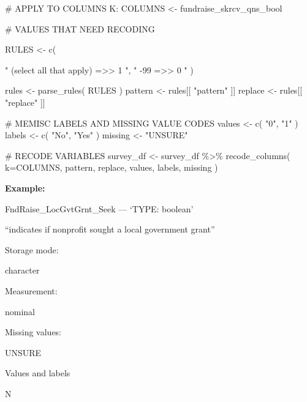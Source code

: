 \documentclass[
  letterpaper,
]{scrbook}
\newenvironment{Shaded}{\begin{snugshade}}{\end{snugshade}}
\newcommand{\AttributeTok}[1]{\textcolor[rgb]{0.40,0.45,0.13}{#1}}
\newcommand{\CommentTok}[1]{\textcolor[rgb]{0.37,0.37,0.37}{#1}}
\newcommand{\FunctionTok}[1]{\textcolor[rgb]{0.28,0.35,0.67}{#1}}
\newcommand{\NormalTok}[1]{\textcolor[rgb]{0.00,0.23,0.31}{#1}}
\newcommand{\OtherTok}[1]{\textcolor[rgb]{0.00,0.23,0.31}{#1}}
\newcommand{\SpecialCharTok}[1]{\textcolor[rgb]{0.37,0.37,0.37}{#1}}
\newcommand{\StringTok}[1]{\textcolor[rgb]{0.13,0.47,0.30}{#1}}
\begin{document}
\begin{Shaded}
\begin{Highlighting}[]
\CommentTok{\# APPLY TO COLUMNS K:}
\NormalTok{COLUMNS }\OtherTok{\textless{}{-}}\NormalTok{  fundraise\_skrcv\_qns\_bool}

\CommentTok{\# VALUES THAT NEED RECODING}

\NormalTok{RULES }\OtherTok{\textless{}{-}} \FunctionTok{c}\NormalTok{(    }
  
  \StringTok{"  (select all that apply)    =\textgreater{}\textgreater{}    1    "}\NormalTok{, }
  \StringTok{"                      {-}99    =\textgreater{}\textgreater{}    0    "}\NormalTok{    )}


\NormalTok{rules }\OtherTok{\textless{}{-}} \FunctionTok{parse\_rules}\NormalTok{( RULES )          }
\NormalTok{pattern }\OtherTok{\textless{}{-}}\NormalTok{ rules[[ }\StringTok{"pattern"}\NormalTok{ ]]}
\NormalTok{replace }\OtherTok{\textless{}{-}}\NormalTok{ rules[[ }\StringTok{"replace"}\NormalTok{ ]]}

\CommentTok{\# MEMISC LABELS AND MISSING VALUE CODES }
\NormalTok{values  }\OtherTok{\textless{}{-}} \FunctionTok{c}\NormalTok{( }\StringTok{"0"}\NormalTok{, }\StringTok{"1"}\NormalTok{ )}
\NormalTok{labels  }\OtherTok{\textless{}{-}} \FunctionTok{c}\NormalTok{( }\StringTok{"No"}\NormalTok{, }\StringTok{"Yes"}\NormalTok{ )}
\NormalTok{missing }\OtherTok{\textless{}{-}} \StringTok{"UNSURE"}

\CommentTok{\# RECODE VARIABLES }
\NormalTok{survey\_df }\OtherTok{\textless{}{-}} 
\NormalTok{  survey\_df }\SpecialCharTok{\%\textgreater{}\%} 
  \FunctionTok{recode\_columns}\NormalTok{( }\AttributeTok{k=}\NormalTok{COLUMNS, pattern, replace, values, labels, missing )}
\end{Highlighting}
\end{Shaded}

\textbf{Example:}

FndRaise\_LocGvtGrnt\_Seek --- {`TYPE: boolean'}

``indicates if nonprofit sought a local government grant''

Storage mode:

character

Measurement:

nominal

Missing values:

UNSURE

Values and labels

N
\end{document}
